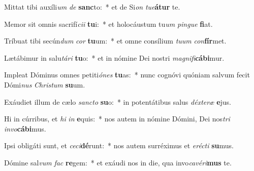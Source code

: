 \item Mittat tibi auxíli\textit{um} \textit{de} \textbf{sanc}to:~* et de Si\textit{on} \textit{tu}\textit{e}\textbf{á}\textbf{tur} te.
\item Memor sit omnis sacrifí\textit{ci}\textit{i} \textbf{tu}i:~* et holocáustum tu\textit{um} \textit{pin}\textit{gue} \textbf{fi}at.
\item Tríbuat tibi secún\textit{dum} \textit{cor} \textbf{tu}um:~* et omne consílium \textit{tu}\textit{um} \textit{con}\textbf{fír}met.
\item Lætábimur in salu\textit{tá}\textit{ri} \textbf{tu}o:~* et in nómine Dei nostri \textit{ma}\textit{gni}\textit{fi}\textbf{cá}\textbf{bi}mur.
\item Impleat Dóminus omnes petiti\textit{ó}\textit{nes} \textbf{tu}as:~* nunc cognóvi quóniam salvum fecit Dómi\textit{nus} \textit{Chris}\textit{tum} \textbf{su}um.
\item Exáudiet illum de cælo \textit{sanc}\textit{to} \textbf{su}o:~* in potentátibus salus \textit{déx}\textit{te}\textit{ræ} \textbf{e}jus.
\item Hi in cúrribus, et \textit{hi} \textit{in} \textbf{e}quis:~* nos autem in nómine Dómini, Dei nos\textit{tri} \textit{in}\textit{vo}\textbf{cá}\textbf{bi}mus.
\item Ipsi obligáti sunt, et \textit{ce}\textit{ci}\textbf{dé}runt:~* nos autem surréximus et \textit{e}\textit{réc}\textit{ti} \textbf{su}mus.
\item Dómine sal\textit{vum} \textit{fac} \textbf{re}gem:~* et exáudi nos in die, qua invo\textit{ca}\textit{vé}\textit{ri}\textbf{mus} te.
